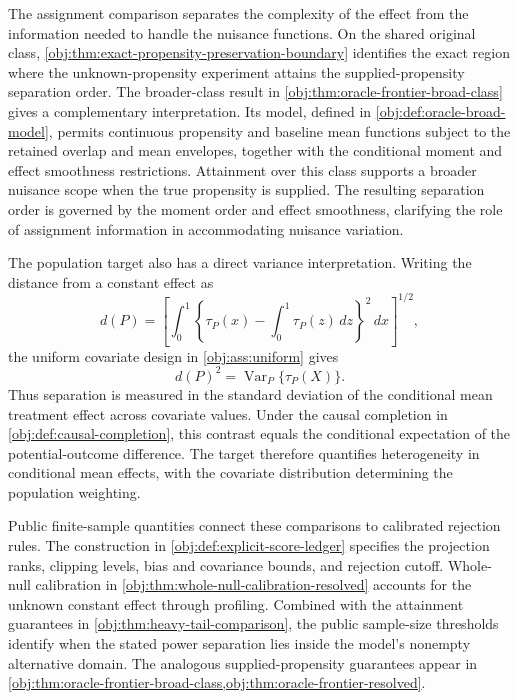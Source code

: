 \documentclass[11pt]{article}
\begin{document}
The assignment comparison separates the complexity of the effect from the information needed to handle the nuisance functions. On the shared original class, \cref{obj:thm:exact-propensity-preservation-boundary} identifies the exact region where the unknown-propensity experiment attains the supplied-propensity separation order. The broader-class result in \cref{obj:thm:oracle-frontier-broad-class} gives a complementary interpretation. Its model, defined in \cref{obj:def:oracle-broad-model}, permits continuous propensity and baseline mean functions subject to the retained overlap and mean envelopes, together with the conditional moment and effect smoothness restrictions. Attainment over this class supports a broader nuisance scope when the true propensity is supplied. The resulting separation order is governed by the moment order and effect smoothness, clarifying the role of assignment information in accommodating nuisance variation.

The population target also has a direct variance interpretation. Writing the distance from a constant effect as
\[
d(P)=
\left[
\int_0^1
\left\{\tau_P(x)-\int_0^1\tau_P(z)\,dz\right\}^{2}\,dx
\right]^{1/2},
\]
the uniform covariate design in \cref{obj:ass:uniform} gives
\[
d(P)^2=\operatorname{Var}_{P}\{\tau_P(X)\}.
\]
Thus separation is measured in the standard deviation of the conditional mean treatment effect across covariate values. Under the causal completion in \cref{obj:def:causal-completion}, this contrast equals the conditional expectation of the potential-outcome difference. The target therefore quantifies heterogeneity in conditional mean effects, with the covariate distribution determining the population weighting.

Public finite-sample quantities connect these comparisons to calibrated rejection rules. The construction in \cref{obj:def:explicit-score-ledger} specifies the projection ranks, clipping levels, bias and covariance bounds, and rejection cutoff. Whole-null calibration in \cref{obj:thm:whole-null-calibration-resolved} accounts for the unknown constant effect through profiling. Combined with the attainment guarantees in \cref{obj:thm:heavy-tail-comparison}, the public sample-size thresholds identify when the stated power separation lies inside the model's nonempty alternative domain. The analogous supplied-propensity guarantees appear in \cref{obj:thm:oracle-frontier-broad-class,obj:thm:oracle-frontier-resolved}.
\end{document}
